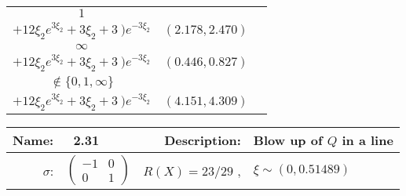 {\begin{tabularx}{\textwidth}{|c|c|c}
\(1\) & \begin{tabular}{l} \(\frac{1}{3\xi_2^{4}} \cdot
 ( \ (2   \xi_2^{3} - 3   \xi_2 - 3) e^{4   \xi_2} \)   \\ \hspace{2cm} \(+12 \xi_2 e^{3 \xi_2} + 3 \xi_2 + 3 \ ) e^{-3 \xi_2}\) \end{tabular} & \((2.178,2.470)\) \\ \midrule
\(\infty\) & \begin{tabular}{l} \(\frac{1}{3\xi_2^{4}} \cdot
 ( \ (2   \xi_2^{3} - 3   \xi_2 - 3) e^{4   \xi_2} \)   \\ \hspace{2cm} \(+12 \xi_2 e^{3 \xi_2} + 3 \xi_2 + 3 \ ) e^{-3 \xi_2}\) \end{tabular} & \((0.446,0.827)\) \\ \midrule
\(\notin \{0,1,\infty\}\) & \begin{tabular}{l} \(\frac{1}{3\xi_2^{4}} \cdot
 ( \ (2   \xi_2^{3} - 3   \xi_2 - 3) e^{4   \xi_2} \)   \\ \hspace{2cm} \(+12 \xi_2 e^{3 \xi_2} + 3 \xi_2 + 3 \ ) e^{-3 \xi_2}\) \end{tabular} & \((4.151,4.309)\) \\
 \bottomrule
\end{tabularx}
\newpage
%
%
%
%
%
%
%
%
\begin{tabularx}{\textwidth}{rlrl}
\toprule
\textbf{Name:} & \ 2.31 \hspace{0.3\textwidth} & \textbf{Description:} & Blow up of $Q$ in a line\\
\midrule
\textbf{$\sigma$}: & {\small $\begin{pmatrix} -1 & 0 \\ 0 & 1 \end{pmatrix}$ } & $ R(X) = 23/29$ , & $\xi \sim (0,0.51489)$
\end{tabularx}

}

